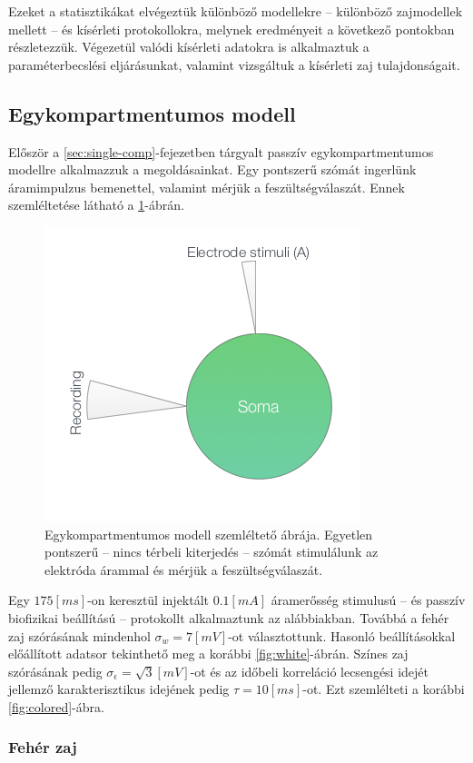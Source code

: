 Ezeket a statisztikákat elvégeztük különböző modellekre -- különböző zajmodellek mellett -- és kísérleti protokollokra, melynek eredményeit a következő pontokban részletezzük. Végezetül valódi kísérleti adatokra is alkalmaztuk a paraméterbecslési eljárásunkat, valamint vizsgáltuk a kísérleti zaj tulajdonságait.



\subsection{Egykompartmentumos modell}
Először a \ref{sec:single-comp}-fejezetben tárgyalt passzív egykompartmentumos modellre alkalmazzuk a megoldásainkat. Egy pontszerű szómát ingerlünk áramimpulzus bemenettel, valamint mérjük a feszültségválaszát. Ennek szemléltetése látható a \ref{fig:point}-ábrán.

\begin{figure}[h!]
	\centering
	\includegraphics[width=0.4\linewidth]{fig/models/point}
	\caption[Egykompartmentumos modell szemléltetése]{Egykompartmentumos modell szemléltető ábrája. Egyetlen pontszerű -- nincs térbeli kiterjedés -- szómát stimulálunk az elektróda árammal és mérjük a feszültségválaszát.}
	\label{fig:point}
\end{figure}

Egy $175 \left[ms\right]$-on keresztül injektált $0.1 \left[mA\right]$ áramerősség stimulusú -- és passzív biofizikai beállítású -- protokollt alkalmaztunk az alábbiakban. Továbbá a fehér zaj szórásának mindenhol $\sigma_w = 7\left[mV\right]$-ot választottunk. Hasonló beállításokkal előállított adatsor tekinthető meg a korábbi \ref{fig:white}-ábrán. Színes zaj szórásának pedig $\sigma_\epsilon = \sqrt{3} \left[mV\right]$-ot és az időbeli korreláció lecsengési idejét jellemző karakterisztikus idejének pedig $\tau=10 \left[ms\right]$-ot. Ezt szemlélteti a korábbi \ref{fig:colored}-ábra.

\subsubsection{Fehér zaj}
